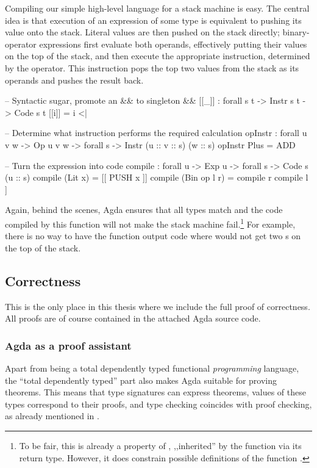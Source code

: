 Compiling our simple high-level language for a stack machine is easy. The
central idea is that execution of an expression of some type is equivalent to
pushing its value onto the stack. Literal values are then pushed on the stack
directly; binary-operator expressions first evaluate both operands, effectively
putting their values on the top of the stack, and then execute the appropriate
instruction, determined by the operator. This instruction pops the top
two values from the stack as its operands and pushes the result back.

\label{sec:simple-compiler}\begin{code}
  -- Syntactic sugar, promote an && to singleton &&
  [[_\;]] : forall {s t} -> Instr s t -> Code s t
  [[i\;]] = i <| \nil

  -- Determine what instruction performs the required calculation
  opInstr : forall {u v w} -> Op u v w -> forall {s} -> Instr (u :: v :: s) (w :: s)
  opInstr Plus = ADD

  -- Turn the expression into code
  compile : forall {u} -> Exp u -> forall {s} -> Code s (u :: s)
  compile (Lit x) = [[ PUSH x ]]
  compile (Bin op l r) = compile r \app compile l \app [[ opInstr op ]]
\end{code}

\noindent Again, behind the scenes, Agda ensures that all types match and the
code compiled by this function will not make the stack machine fail.\footnote{
  To be fair, this is already a property of , ,,inherited'' by the
  function  via its return type.  However, it does constrain
possible definitions of the function .} For example, there is no
way to have the function  output code where  would
not get two s on the top of the stack.

\subsection{Correctness}

This is the only place in this thesis where we include the full proof
of correctness. All proofs are of course contained in the attached Agda source
code.

\subsubsection{Agda as a proof assistant}

Apart from being a total dependently typed functional \emph{programming} language,
the ``total dependently typed'' part also makes Agda suitable for proving theorems.
This means that type signatures can express theorems, values of these
types correspond to their proofs, and type checking coincides with proof checking,
as already mentioned in .

